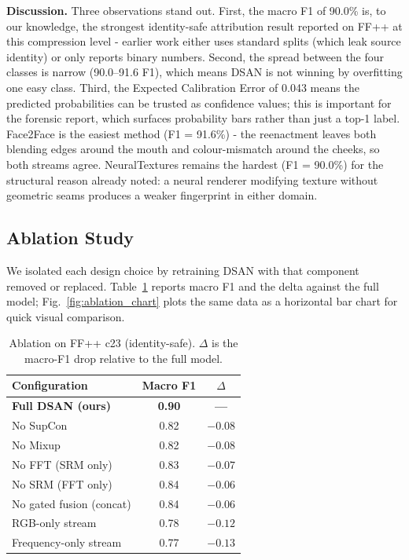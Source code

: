 \textbf{Discussion.}  Three observations stand out. First, the macro F1 of 90.0\% is, to our knowledge, the strongest identity-safe attribution result reported on FF++ at this compression level - earlier work either uses standard splits (which leak source identity) or only reports binary numbers. Second, the spread between the four classes is narrow (90.0--91.6 F1), which means DSAN is not winning by overfitting one easy class. Third, the Expected Calibration Error of 0.043 means the predicted probabilities can be trusted as confidence values; this is important for the forensic report, which surfaces probability bars rather than just a top-1 label. Face2Face is the easiest method (F1 = 91.6\%) - the reenactment leaves both blending edges around the mouth and colour-mismatch around the cheeks, so both streams agree. NeuralTextures remains the hardest (F1 = 90.0\%) for the structural reason already noted: a neural renderer modifying texture without geometric seams produces a weaker fingerprint in either domain.

\subsection{Ablation Study}
\label{sec:ablation}

We isolated each design choice by retraining DSAN with that component removed or replaced. Table~\ref{tab:ablation} reports macro F1 and the delta against the full model; Fig.~\ref{fig:ablation_chart} plots the same data as a horizontal bar chart for quick visual comparison.

\begin{table}[!t]
\centering
\caption{Ablation on FF++ c23 (identity-safe). $\Delta$ is the macro-F1 drop relative to the full model.}
\label{tab:ablation}
\begin{tabular}{@{}lcc@{}}
\toprule
\textbf{Configuration}      & \textbf{Macro F1} & \textbf{$\Delta$} \\
\midrule
\textbf{Full DSAN (ours)}            & \textbf{0.90}   & \textbf{---}    \\
\midrule
\quad No SupCon                      & 0.82            & $-0.08$ \\
\quad No Mixup                       & 0.82            & $-0.08$ \\
\quad No FFT (SRM only)              & 0.83            & $-0.07$ \\
\quad No SRM (FFT only)              & 0.84            & $-0.06$ \\
\quad No gated fusion (concat)       & 0.84            & $-0.06$ \\
\midrule
\quad RGB-only stream                & 0.78            & $-0.12$ \\
\quad Frequency-only stream          & 0.77            & $-0.13$ \\
\bottomrule
\end{tabular}
\end{table}

